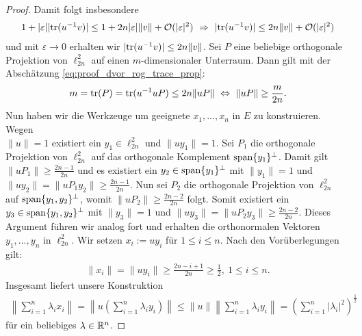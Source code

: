 \begin{proof}
	Damit folgt insbesondere
	\begin{align*}
		1 + | \varepsilon | | \mathrm{tr} ( u^{-1} v) | 
		\leq 
		1 + 2n | \varepsilon |  \| v \| + \mathcal{O}(|\varepsilon|^2)
		\ \Rightarrow \
		| \mathrm{tr} ( u^{-1} v) | 
		\leq 2n \| v \| + \mathcal{O}(|\varepsilon|^2)
	\end{align*}
	und mit $ \varepsilon \to 0 $ erhalten wir $ | \mathrm{tr} ( u^{-1} v) | 
	\leq 2n \| v \| $.\newpage
	Sei $ P $ eine beliebige orthogonale Projektion von $ \ell^2_{2n} $
	auf einen $ m $-dimensionaler Unterraum.
	Dann gilt mit der Abschätzung \eqref{eq:proof_dvor_rog_trace_prop}:
	\begin{align*}
		m = \mathrm{tr}(P)
		=\mathrm{tr}(u^{-1} u P)
		\leq 2n \|u P \|
		\ \Leftrightarrow \
		\| u P \| \geq \frac{m}{2n}.
	\end{align*}
	Nun haben wir die Werkzeuge um geeignete $ x_1,...,x_n $ in $ E $ zu konstruieren.
	Wegen \\ $ \| u \| = 1 $ existiert ein $ y_1 \in \ell^2_{2n} $ und $ \| u y_1 \| = 1 $.
	Sei $ P_1 $ die orthogonale Projektion von $ \ell^2_{2n} $ auf das orthogonale Komplement $ \mathrm{span}\{y_1\}^\perp $.
	Damit gilt $ \|u P_1 \| \geq \frac{2n-1}{2n} $ und es existiert ein $ y_2 \in  \mathrm{span}\{y_1\}^\perp $ mit $ \| y_1 \| = 1 $ und $ \| u y_2 \| = \| u P_1 y_2 \| \geq \frac{2n -1}{2n} $.
	Nun sei $ P_2 $ die orthogonale Projektion von $ \ell^2_{2n} $ auf $ \mathrm{span} \{y_1,y_2\}^\perp $, womit $ \| u P_2 \| \geq \frac{2n-2}{2n} $ folgt.
	Somit existiert ein \\ 
	$ y_3 \in \mathrm{span} \{y_1,y_2\}^\perp $ mit $ \| y_3 \| = 1 $ 
	und $ \| u y_3 \| =  \| u P_2 y_3 \| \geq \frac{2n-2}{2n} $.
	Dieses Argument führen wir analog  fort und erhalten die orthonormalen Vektoren $ y_1,...,y_n$ in $  \ell^2_{2n} $.
	Wir setzen $ x_i := u y_i $ für $ 1 \leq i \leq n $.
	Nach den Vorüberlegungen gilt:
	\begin{align*}
		\| x_i \| = \| u y_i \| \geq  \frac{2n -i +1}{2n} \geq \frac{1}{2}, \ 1 \leq i \leq n.
	\end{align*}
	Insgesamt liefert unsere Konstruktion
	\begin{align*}
		\left\|
		\sum \limits_{i=1}^n\lambda_i x_i
		\right\|
		= 
		\left\|
		u 
		\left(
		\sum \limits_{i=1}^n \lambda_i y_i
		\right)
		\right\| 
		\leq 
		\| u \| 
		\left\|
		\sum \limits_{i=1}^n
		\lambda_i y_i
		\right\|
		= 
		\left(\sum \limits_{i=1}^n |\lambda_i |^2 \right)^\frac{1}{2}
	\end{align*}
	für ein beliebiges $ \lambda \in \mathbb{R}^n $.
\end{proof}



